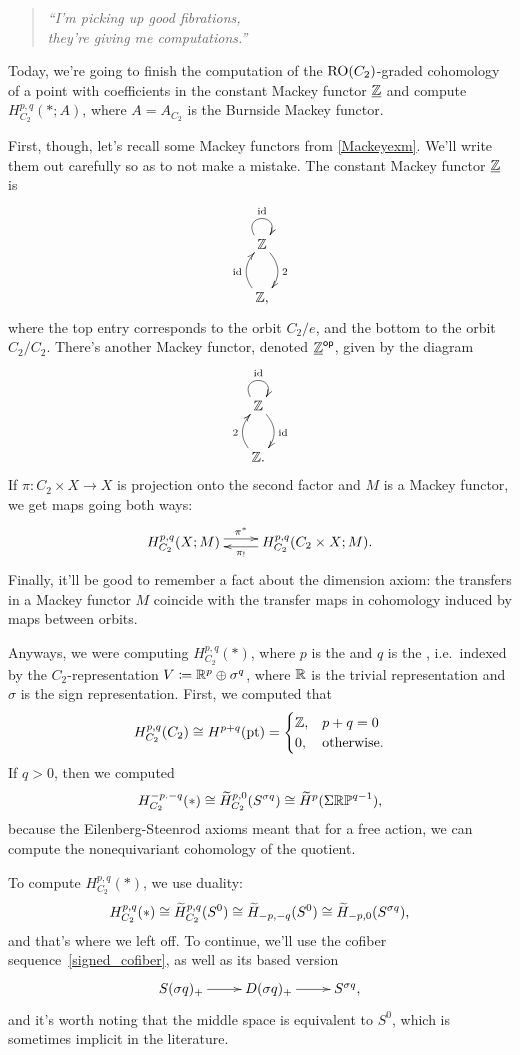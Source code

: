 \begin{quote}\textit{
	``I'm picking up good fibrations,\\
	they're giving me computations.''
}\end{quote}
Today, we're going to finish the computation of the $\mathrm{RO}(C_2)$-graded cohomology of a point with coefficients in
the constant Mackey functor $\underline{\mathbb Z}$ and compute $H_{C_2}^{p,q}(*; A)$, where $A = A_{C_2}$ is the Burnside
Mackey functor.

First, though, let's recall some Mackey functors from \cref{Mackeyexm}. We'll write them out carefully so as to not
make a mistake. The constant Mackey functor $\underline{\mathbb Z}$ is
\[\xymatrix{
	\Z\ar@/^0.4cm/[d]^2\ar@(ul,ur)^\id\\
	\Z,\ar@/^0.4cm/[u]^\id
}\]
where the top entry corresponds to the orbit $C_2/e$, and the bottom to the orbit $C_2/C_2$. There's another Mackey
functor, denoted $\underline{\mathbb Z}^{\mathsf{op}}$, given by the diagram
\[\xymatrix{
	\Z\ar@/^0.4cm/[d]^\id\ar@(ul,ur)^\id\\
	\Z.\ar@/^0.4cm/[u]^2
}\]
If $\pi\colon C_2\times X\to X$ is projection onto the second factor and $M$ is a Mackey functor, we get maps going
both ways:
\[\xymatrix{
	H_{C_2}^{p,q}(X;M)\ar@<0.1cm>[r]^-{\pi^*} & H_{C_2}^{p,q}(C_2\times X; M).\ar@<0.1cm>[l]^-{\pi_!}
}\]
Finally, it'll be good to remember a fact about the dimension axiom: the transfers in a Mackey functor $M$ coincide
with the transfer maps in cohomology induced by maps between orbits.

Anyways, we were computing $H_{C_2}^{p,q}(*)$, where $p$ is the  and $q$ is the , i.e.\ indexed by the $C_2$-representation $V \coloneqq \mathbb R^p\oplus\sigma^q$, where $\mathbb R$ is the trivial
representation and $\sigma$ is the sign representation. First, we computed that
\[H_{C_2}^{p,q}(C_2)\cong H^{p+q}(\mathrm{pt}) = \begin{cases}
	\mathbb Z, &p+q = 0\\
	0, &\text{otherwise.}
\end{cases}\]
If $q > 0$, then we computed
\[H^{-p.-q}_{C_2}(*) \cong \widetilde H_{C_2}^{p,0}(S^{\sigma q})\cong\widetilde H^p(\Sigma\mathbb{RP}^{q-1}),\]
because the Eilenberg-Steenrod axioms meant that for a free action, we can compute the nonequivariant cohomology of
the quotient.

To compute $H_{C_2}^{p,q}(*)$, we use duality:
\[H_{C_2}^{p,q}(*) \cong \widetilde H^{p,q}_{C_2}(S^0)\cong \widetilde H_{-p,-q}(S^0)\cong \widetilde H_{-p,0}(S^{\sigma q}),\]
and that's where we left off. To continue, we'll use the cofiber sequence~\eqref{signed_cofiber}, as well as its
based version
\begin{equation}
\label{based_signed}
\xymatrix{
	S(\sigma q)_+\ar[r] & D(\sigma q)_+\ar[r] & S^{\sigma q},
}
\end{equation}
and it's worth noting that the middle space is equivalent to $S^0$, which is sometimes implicit in the literature.

